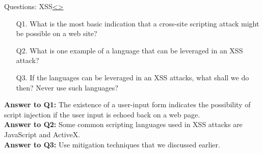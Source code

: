 \documentclass[12pt]{extarticle}
\newenvironment{instructionblock}{\Large\bgroup}{\egroup}
\begin{document}
\pagebreak
\begin{slide}{Questions: XSS}{\hyperref[slide 10]{\textless}\hyperref[slide 12]{\textgreater}}
	\vspace{2mm}
	\begin{instructionblock}
		\begin{enumerate} 
		\item[Q1.] What is the most basic indication that a cross-site scripting attack might be possible on a web site?
		\item[Q2.] What is one example of a language that can be leveraged in an XSS attack?
		\item[Q3.] If the languages can be leveraged in an XSS attacks, what shall we do then? Never use such languages?  
		\end{enumerate}
	\end{instructionblock}
\end{slide}
\vfill
\noindent
\textbf{Answer to Q1:} The existence of a user-input form indicates the possibility of script injection if the user input is echoed back on a web page.\\  

\noindent
\textbf{Answer to Q2:} Some common scripting languages used in XSS attacks are JavaScript and ActiveX.\\

\noindent
\textbf{Answer to Q3:} Use mitigation techniques that we discussed earlier.




%
\end{document}
